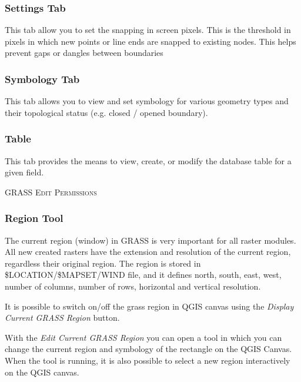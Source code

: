 \subsubsection{Settings Tab}\label{label_settingtab}

This tab allow you to set the snapping in screen pixels. This is the threshold
in pixels in which new points or line ends are snapped to existing nodes. This
helps prevent gaps or dangles between boundaries

\subsubsection{Symbology Tab}

This tab allows you to view and set symbology for various geometry types and
their topological status (e.g. closed / opened boundary).

\subsubsection{Table} 
This tab provides the means to view, create, or modify the database table for
a given field.

\begin{Tip}\caption{\textsc{GRASS Edit Permissions}}
\end{Tip} 

\subsubsection{Region Tool}

The current region (window) in GRASS is very important for all 
raster modules. All new created rasters have the extension and resolution
of the current region, regardless their original region. 
The region is stored in \$LOCATION/\$MAPSET/WIND file, and it defines
north, south, east, west, number of columns, number of rows, 
horizontal and vertical resolution.

It is possible to switch on/off the grass region in QGIS canvas
using the \textsl{Display Current GRASS Region}
button. 

With the \textsl{Edit Current GRASS Region} you can open a tool 
in which you can change the current region and symbology
of the rectangle on the QGIS Canvas. When the tool is running,
it is also possible to select a new region interactively
on the QGIS canvas.

